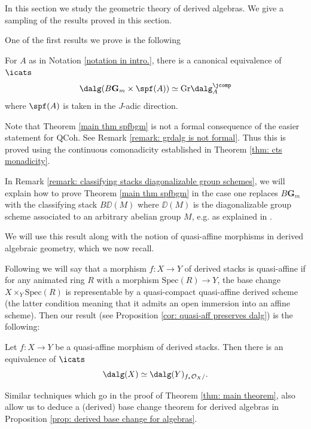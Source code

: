 \documentclass[10pt,reqno]{amsart}
\numberwithin{equation}{section}
\newcommand{\cO}{{\mathcal{O}}}
\newcommand{\G}{\mathbf{G}}
\newcommand{\spec}{{\mathrm{Spec}}}
\newcommand{\Qcoh}{\mathrm{QCoh}}
\newcommand{\Gr}{\mathrm{Gr}}
\begin{document}
In this section we study the geometric theory of derived algebras. We give a sampling of the results proved in this section.

One of the first results we prove is the following



\begin{theorem}\label{main thm spfbgm}
     For $A$ as in Notation \ref{notation in intro.}, there is a canonical equivalence of $\icats$ $$\dalg(B\G_m\times \spf(A))\simeq \Gr\dalg^\jcomp_A$$ where $\spf(A)$ is taken in the $J$-adic direction. 
\end{theorem}

Note that Theorem \ref{main thm spfbgm} is not a formal consequence of the easier statement for $\Qcoh$. See Remark \ref{remark: grdalg is not formal}. Thus this is proved using the continuous comonadicity established in Theorem \ref{thm: cts monadicity}.


In Remark \ref{remark: classifying stacks diagonalizable group schemes}, we will explain how to prove Theorem \ref{main thm spfbgm} in the case one replaces $B\G_m$ with the classifying stack $B\DD(M)$ where $\DD(M)$ is the diagonalizable group scheme  associated to an arbitrary abelian group $M$, e.g. as explained in \cite[\S~2]{Tate1997FiniteFlatGroupSchemes}.


We will use this result along with the notion of quasi-affine morphisms in derived algebraic geometry, which we now recall.

Following \cite{GaitsgoryRozenblyum2017SAGI} we will say that a morphism $f\colon X\to Y$ of derived stacks is quasi-affine if for any animated ring $R$ with a morphism $\spec (R)\to Y$, the base change $X\times_Y \spec(R)$ is representable by a quasi-compact quasi-affine derived scheme (the latter condition meaning that it admits an open immersion into an affine scheme). Then our result (see Proposition \ref{cor: quasi-aff preserves dalg}) is the following:

\begin{theorem}\label{thm: intro quasiaffine embedding}
    Let $f\colon X\to Y$ be a quasi-affine morphism of derived stacks. Then there is an equivalence of $\icats$ $$\dalg(X)\simeq \dalg(Y)_{f_*\cO_X/}.$$
\end{theorem}


Similar techniques which go in the proof of Theorem \ref{thm: main theorem}, also allow us to deduce a (derived) base change theorem for derived algebras in Proposition \ref{prop: derived base change for algebras}.
\end{document}
